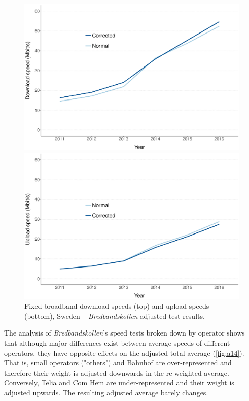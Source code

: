\documentclass[12pt]{article}
\begin{document}
\vspace{1cm}
\begin{figure}[H]
	\begin{minipage}{0.5\textwidth}
        \centering
        \includegraphics[width=\textwidth]{download_speeds_corrected.pdf} 
		
    \end{minipage}\hfill
    \begin{minipage}{0.5\textwidth}
        \centering
        \includegraphics[width=\textwidth]{upload_speeds_corrected.pdf}
    \end{minipage}
         \caption{Fixed-broadband download speeds (top) and upload speeds (bottom), Sweden -- \textit{Bredbandskollen} adjusted test results.}
        \label{fig:a13}
\end{figure}  

The analysis of \textit{Bredbandskollen}'s speed tests broken down by operator shows that although major differences exist between average speeds of different operators, they have opposite effects on the adjusted total average (\autoref{fig:a14}). That is, small operators ("others") and Bahnhof are over-represented and therefore their weight is adjusted downwards in the re-weighted average. Conversely, Telia and Com Hem are under-represented and their weight is adjusted upwards. The resulting adjusted average barely changes.    
\end{document}
